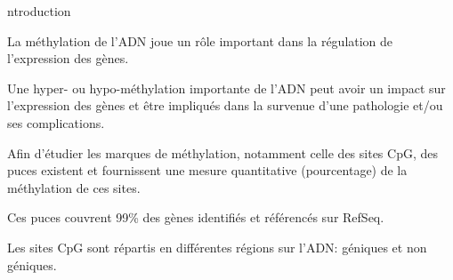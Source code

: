 \begin{frame}[allowframebreaks]{ntroduction}
\par{La méthylation de l'ADN joue un rôle important dans la régulation de l'expression des gènes.}
\vspace{1cm}
\par{Une hyper- ou hypo-méthylation importante de l'ADN peut avoir un impact sur l'expression des gènes et être impliqués dans la survenue d'une pathologie et/ou ses complications.}
\framebreak
\par{Afin d'étudier les marques de méthylation, notamment celle des sites CpG, des puces existent et fournissent une mesure quantitative (pourcentage) de la méthylation de ces sites.}
\begin{center}
\end{center}
\vspace{1cm}
\par{Ces puces couvrent 99\% des gènes identifiés et référencés sur RefSeq.}
\framebreak
\par{Les sites CpG sont répartis en différentes régions sur l'ADN: géniques et non géniques.}
\begin{center}
\end{center}
\begin{center}
\end{center}
\end{frame}

